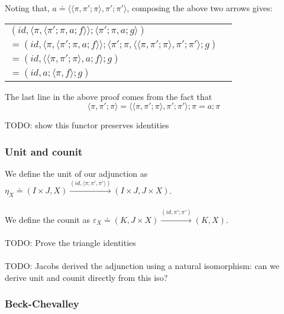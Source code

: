 \documentclass{article}
\begin{document}
Noting that, $a \doteq \langle \langle \pi,\pi';\pi \rangle, \pi';\pi' \rangle$, composing the above two arrows gives:

\begin{center}
\begin{tabular}{ll}
$(\mathit{id}, \langle \pi, \langle \pi';\pi,a;f \rangle \rangle;\langle \pi';\pi,a;g\rangle)$ &  \\
$= (\mathit{id}, \langle \pi, \langle \pi';\pi,a;f \rangle \rangle;\langle \pi';\pi,\langle \langle \pi,\pi';\pi \rangle, \pi';\pi' \rangle;g)$ & \\
$= (\mathit{id}, \langle \langle \pi, \pi';\pi \rangle, a;f \rangle;g)$  & \\
$= (\mathit{id}, a;\langle \pi,f \rangle;g)$
\end{tabular}
\end{center}

The last line in the above proof comes from the fact that 
$$\langle \pi,\pi';\pi \rangle = \langle \langle \pi,\pi';\pi \rangle, \pi';\pi' \rangle;\pi = a;\pi$$

TODO: show this functor preserves identities

\subsubsection*{Unit and counit}

We define the unit of our adjunction as $\eta_X \doteq (I \times J, X) \overset{(\mathit{id},\langle \pi;\pi',\pi' \rangle)}{\longrightarrow} (I \times J, J \times X)$.\\~\\
We define the counit as $\varepsilon_X \doteq (K, J \times X) \overset{(id, \pi';\pi')}{\longrightarrow} (K,X)$.\\~\\
TODO: Prove the triangle identities\\~\\
TODO: Jacobs derived the adjunction using a natural isomorphism: can we derive unit and counit directly from this iso?

\subsubsection*{Beck-Chevalley}
\end{document}
